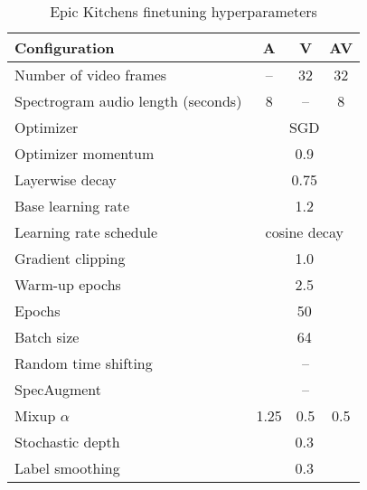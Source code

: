 \documentclass[10pt,twocolumn,letterpaper]{article}
\begin{document}
\begin{table}[th] 
	\caption{Epic Kitchens finetuning hyperparameters}
	\vspace{-0.6\baselineskip}
	\centering
		\begin{tabular}{lccc}
			\toprule 
			Configuration        & A  & V & AV \\
			\midrule
			Number of video frames     & -- & 32 & 32\\
			Spectrogram audio length (seconds)    & 8 & -- & 8  \\
			\midrule
			Optimizer              &  \multicolumn{3}{c}{SGD}   \\
			Optimizer momentum        &   \multicolumn{3}{c}{0.9} \\
			Layerwise decay~\cite{bao2021beit, clark2020electra}    &  \multicolumn{3}{c}{0.75}  \\
			Base learning rate          &  \multicolumn{3}{c}{1.2} \\
			Learning rate schedule     &  \multicolumn{3}{c}{cosine decay} \\
			Gradient clipping        &   \multicolumn{3}{c}{1.0}  \\  
			Warm-up epochs          &   \multicolumn{3}{c}{2.5} \\
			Epochs                 &   \multicolumn{3}{c}{50} \\
			Batch size             &   \multicolumn{3}{c}{64} \\
			\midrule 
			Random time shifting     & \checkmark     & --    &  \checkmark  \\
		    SpecAugment \cite{park2019specaugment}   & \checkmark  & -- & \checkmark \\
			Mixup $\alpha$ \cite{zhang_mixup_iclr_2018}           & 1.25 & 0.5 & 0.5 \\
			Stochastic depth  \cite{huang_stochasticdepth_eccv_2016}    &  \multicolumn{3}{c}{0.3} \\
			Label smoothing  \cite{szegedy_cvpr_2016}          &  \multicolumn{3}{c}{0.3} \\
			\bottomrule
		\end{tabular}
		\label{tab:hyperparams_epic_kitchens}
\end{table}
\end{document}
